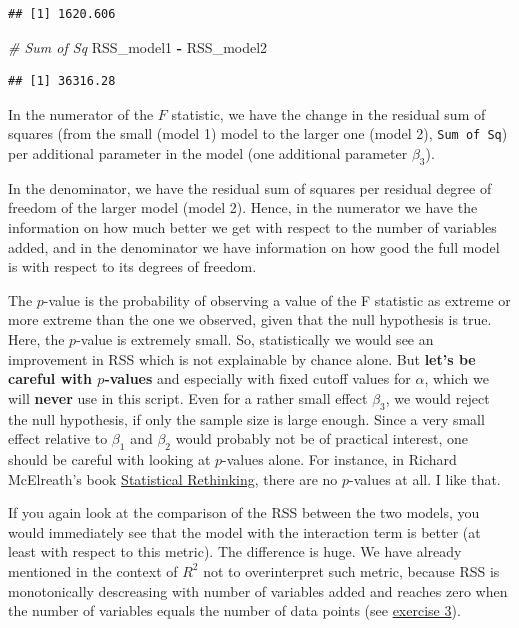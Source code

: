 \documentclass[
]{book}
\newenvironment{Shaded}{\begin{snugshade}}{\end{snugshade}}
\newcommand{\CommentTok}[1]{\textcolor[rgb]{0.56,0.35,0.01}{\textit{#1}}}
\newcommand{\NormalTok}[1]{#1}
\newcommand{\SpecialCharTok}[1]{\textcolor[rgb]{0.81,0.36,0.00}{\textbf{#1}}}
\begin{document}
\begin{verbatim}
## [1] 1620.606
\end{verbatim}

\begin{Shaded}
\begin{Highlighting}[]
\CommentTok{\# Sum of Sq}
\NormalTok{RSS\_model1 }\SpecialCharTok{{-}}\NormalTok{ RSS\_model2}
\end{Highlighting}
\end{Shaded}

\begin{verbatim}
## [1] 36316.28
\end{verbatim}

In the numerator of the \(F\) statistic, we have the change in the residual sum of squares
(from the small (model 1) model to the larger one (model 2), \texttt{Sum\ of\ Sq})
per additional parameter in the model (one additional parameter \(\beta_3\)).

In the denominator, we have the residual sum of squares per residual degree of freedom of
the larger model (model 2). Hence, in the numerator we have the information on how much
better we get with respect to the number of variables added, and in the denominator
we have information on how good the full model is with respect to its degrees of freedom.

The \(p\)-value is the probability of observing a value of the F statistic as extreme or more
extreme than the one we observed, given that the null hypothesis is true. Here,
the \(p\)-value is extremely small. So, statistically we would see an improvement in RSS
which is not explainable by chance alone.
But \textbf{let's be careful with \(p\)-values} and especially with fixed cutoff values for \(\alpha\),
which we will \textbf{never} use in this script.
Even for a rather small effect \(\beta_3\), we would reject the null hypothesis, if only the sample
size is large enough. Since a very small effect relative to \(\beta_1\) and \(\beta_2\) would
probably not be of practical interest, one should be careful with looking at \(p\)-values alone.
For instance, in Richard McElreath's book \href{https://xcelab.net/rm/statistical-rethinking/}{Statistical Rethinking},
there are no \(p\)-values at all. I like that.

If you again look at the comparison of the RSS between the two models, you would
immediately see that the model with the interaction term is better (at least with respect to this metric).
The difference is huge. We have already mentioned in the context of \(R^2\) not to overinterpret
such metric, because RSS is monotonically descreasing with number of variables added and reaches
zero when the number of variables equals the number of data points (see \hyperref[exercise3_multiple_regression]{exercise 3}).
\end{document}
